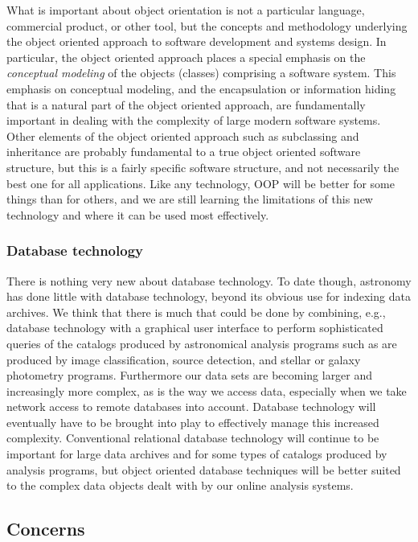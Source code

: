 What is important about object orientation is not a particular language,
commercial product, or other tool, but the concepts and methodology
underlying the object oriented approach to software development and systems
design.  In particular, the object oriented approach places a special
emphasis on the {\it conceptual modeling} of the objects (classes)
comprising a software system.  This emphasis on conceptual modeling, and the
encapsulation or information hiding that is a natural part of the object
oriented approach, are fundamentally important in dealing with the
complexity of large modern software systems.  Other elements of the object
oriented approach such as subclassing and inheritance are probably
fundamental to a true object oriented software structure, but this is a
fairly specific software structure, and not necessarily the best one for all
applications.  Like any technology, OOP will be better for some things than
for others, and we are still learning the limitations of this new technology
and where it can be used most effectively.

\subsubsection {Database technology}

There is nothing very new about database technology.  To date though,
astronomy has done little with database technology, beyond its obvious use
for indexing data archives.  We think that there is much that could be done
by combining, e.g., database technology with a graphical user interface to
perform sophisticated queries of the catalogs produced by astronomical
analysis programs such as are produced by image classification, source
detection, and stellar or galaxy photometry programs.  Furthermore our data
sets are becoming larger and increasingly more complex, as is the way we
access data, especially when we take network access to remote databases into
account.  Database technology will eventually have to be brought into play
to effectively manage this increased complexity.  Conventional relational
database technology will continue to be important for large data archives
and for some types of catalogs produced by analysis programs, but object
oriented database techniques will be better suited to the complex data
objects dealt with by our online analysis systems.

\subsection {Concerns}

